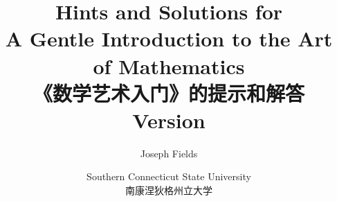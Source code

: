 \documentclass[12pt,twoside]{book}
\begin{document}
\frontmatter

\title{Hints and Solutions for \\
A Gentle Introduction to the Art of Mathematics\\ 《数学艺术入门》的提示和解答 \\{\small Version \versionNum
{} }}
\author{Joseph Fields}
\date{Southern Connecticut State University \\ 南康涅狄格州立大学}

\maketitle

\clearpage




\clearpage

\mainmatter










\end{document}
